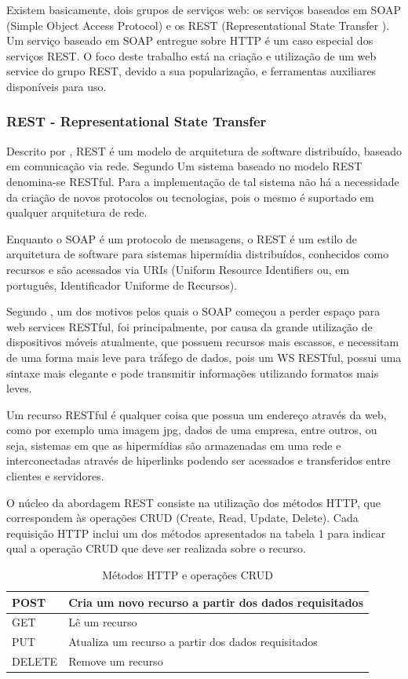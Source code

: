 \documentclass[12pt]{article}
\begin{document}
Existem basicamente, dois grupos de serviços web: os serviços baseados em SOAP (Simple Object Access Protocol) e os REST (Representational
State Transfer ). Um serviço baseado em SOAP entregue sobre HTTP é um caso especial dos serviços REST. O foco deste trabalho está na criação e utilização de um web service do grupo REST, devido a sua popularização, e ferramentas auxiliares disponíveis para uso.

\subsubsection{REST - Representational State Transfer}

Descrito por \cite{rest}, REST é um modelo de arquitetura de software distribuído, baseado em comunicação via rede.
Segundo \cite{richard:07} Um sistema baseado no modelo REST denomina-se RESTful. Para a implementação de tal sistema não há a necessidade da criação de novos protocolos ou tecnologias, pois o mesmo é suportado em qualquer arquitetura de rede.

Enquanto o SOAP é um protocolo de mensagens, o REST é um estilo de arquitetura
de software para sistemas hipermídia distribuídos, conhecidos como recursos e são acessados via URIs (Uniform Resource Identifiers ou, em português, Identificador Uniforme de Recursos). 

Segundo \cite{lecheta:15}, um dos motivos pelos quais o SOAP começou a perder espaço para web services RESTful, foi principalmente, por causa da grande utilização de dispositivos móveis atualmente, que possuem recursos mais escassos, e necessitam de uma forma mais leve para tráfego de dados, pois um WS RESTful, possui uma sintaxe mais elegante e pode transmitir informações utilizando formatos mais leves.

Um recurso RESTful é qualquer coisa que possua um endereço através da web, como por exemplo uma imagem jpg, dados de uma empresa, entre outros, ou seja, sistemas em que as hipermídias são armazenadas em uma rede e interconectadas através de hiperlinks podendo ser acessados e transferidos entre clientes e servidores.

O núcleo da abordagem REST consiste na utilização dos métodos HTTP, que correspondem às operações CRUD (Create, Read, Update, Delete). Cada requisição HTTP inclui um dos métodos apresentados na tabela 1 para indicar qual a operação CRUD que deve ser realizada sobre o recurso.
\begin{table}[ht]
	\centering
	\caption{Métodos HTTP e operações CRUD}
	\label{tab:Table1}
	\smallskip
	\begin{tabular}{ |l|l| }
		\hline
		POST & Cria um novo recurso a partir dos dados requisitados \\ \hline
		GET & Lê um recurso \\ \hline
		PUT & Atualiza um recurso a partir dos dados requisitados \\ \hline
		DELETE & Remove um recurso \\
		\hline
	\end{tabular}
\end{table}
\end{document}
